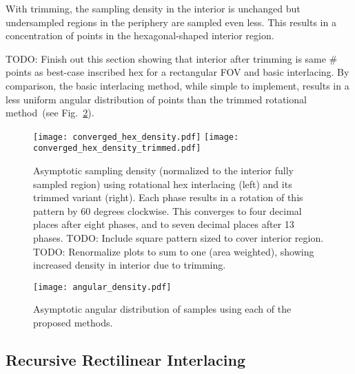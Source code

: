 \documentclass{article}
\newcommand{\reffig}[1]{Fig.~\ref{fig:#1}}
\begin{document}
%
With trimming, the sampling density in the interior is unchanged but undersampled regions in the periphery are sampled even less.
%
This results in a concentration of points in the hexagonal-shaped interior region.


TODO: Finish out this section showing that interior after trimming is same \# points as best-case inscribed hex for a rectangular FOV and basic interlacing.
%
By comparison, the basic interlacing method, while simple to implement, results in a less uniform angular distribution of points than the trimmed rotational method~(see \reffig{angdens}).

\begin{figure}[ht]
\centering
\texttt{[image: converged\_hex\_density.pdf]}
\texttt{[image: converged\_hex\_density\_trimmed.pdf]}
\caption{
\label{fig:hexdensity}
	Asymptotic sampling density (normalized to the interior fully sampled region) using rotational hex interlacing (left) and its trimmed variant (right).
%
Each phase results in a rotation of this pattern by 60 degrees clockwise.
%
This converges to four decimal places after eight phases, and to seven decimal places after 13 phases.
%
TODO: Include square pattern sized to cover interior region.
%
TODO: Renormalize plots to sum to one (area weighted), showing increased density in interior due to trimming.
%
}
\end{figure}


\begin{figure}
\centering
\texttt{[image: angular\_density.pdf]}
\caption{
\label{fig:angdens} 
	Asymptotic angular distribution of samples using each of the proposed methods.
}
\end{figure}

\subsection{Recursive Rectilinear Interlacing}
\label{sec:recursive}
\end{document}
